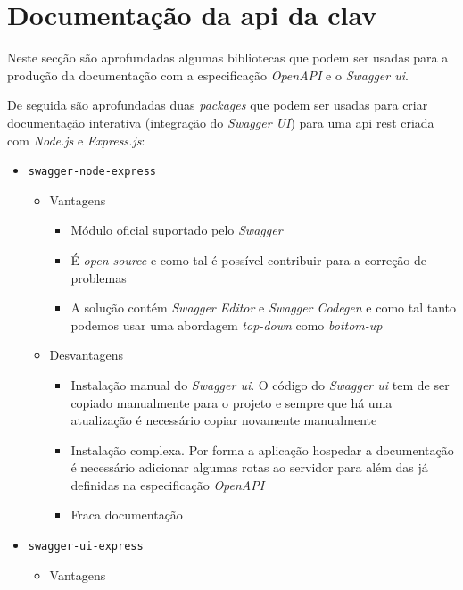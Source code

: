 \section{Documentação da \acrshort{api} da \acrshort{clav}}\label{sec:soaDocAPI}

Neste secção são aprofundadas algumas bibliotecas que podem ser usadas para a produção da documentação com a especificação \textit{OpenAPI} e o \textit{Swagger \acrshort{ui}}. 

De seguida são aprofundadas duas \textit{packages} que podem ser usadas para criar documentação interativa (integração do \textit{Swagger UI}) para uma \acrshort{api} \acrshort{rest} criada com \textit{Node.js} e \textit{Express.js}:~\cite{swaggerNode}
\begin{itemize}
    \item \texttt{swagger-node-express}
    \begin{itemize}
        \item Vantagens
        \begin{itemize}
            \item Módulo oficial suportado pelo \textit{Swagger}
            \item É \textit{open-source} e como tal é possível contribuir para a correção de problemas
            \item A solução contém \textit{Swagger Editor} e \textit{Swagger Codegen} e como tal tanto podemos usar uma abordagem \textit{top-down} como \textit{bottom-up}
        \end{itemize}
        \item Desvantagens
        \begin{itemize}
            \item Instalação manual do \textit{Swagger \acrshort{ui}}. O código do \textit{Swagger \acrshort{ui}} tem de ser copiado manualmente para o projeto e sempre que há uma atualização é necessário copiar novamente manualmente
            \item Instalação complexa. Por forma a aplicação hospedar a documentação é necessário adicionar algumas rotas ao servidor para além das já definidas na especificação \textit{OpenAPI}
            \item Fraca documentação
        \end{itemize}
    \end{itemize}
    \item \texttt{swagger-ui-express}
    \begin{itemize}
        \item Vantagens

\end{itemize}
\end{itemize}
